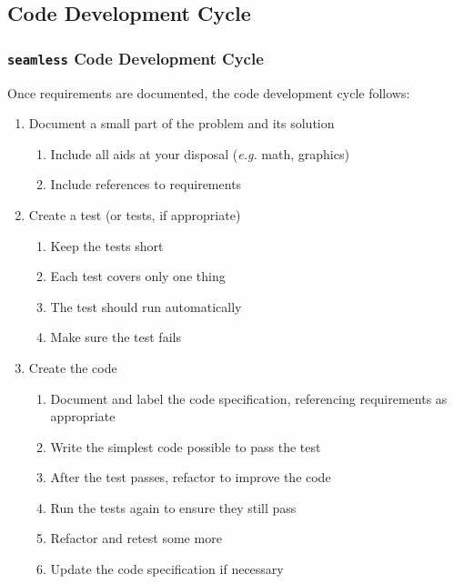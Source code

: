 \documentclass{beamer}
\makeatletter
\newcommand*{\eg}{\emph{e.g.}\@\xspace}
\newcommand*{\seamless}{\texttt{seamless}\@\xspace}
\makeatother
\begin{document}
\subsection{Code Development Cycle}
\begin{frame}
  \frametitle{\seamless Code Development Cycle}
  Once requirements are documented, the code development cycle follows:
  \begin{enumerate}
    \item Document a small part of the problem and its solution 
      \begin{enumerate}
        \item Include all aids at your disposal (\eg math, graphics) 
        \item Include references to requirements
      \end{enumerate}
    \item Create a test (or tests, if appropriate) 
      \begin{enumerate}
        \item Keep the tests short
        \item Each test covers only one thing 
        \item The test should run automatically
        \item Make sure the test fails
      \end{enumerate}
    \item Create the code
      \begin{enumerate}
        \item Document and label the code specification, referencing requirements as appropriate
        \item Write the simplest code possible to pass the test
        \item After the test passes, refactor to improve the code
        \item Run the tests again to ensure they still pass
        \item Refactor and retest some more
        \item Update the code specification if necessary
      \end{enumerate}
  \end{enumerate}
\end{frame}
\end{document}
